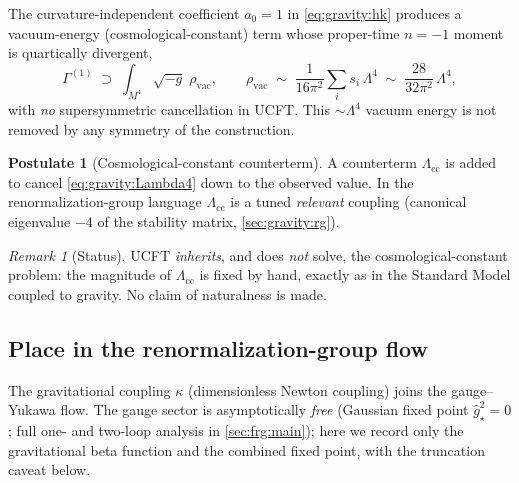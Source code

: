 \documentclass[11pt]{article}
\theoremstyle{plain}
\theoremstyle{definition}
\newtheorem{postulate}[theorem]{Postulate}
\theoremstyle{remark}
\newtheorem{remark}[theorem]{Remark}
\begin{document}
The curvature-independent coefficient $a_{0}=1$ in \eqref{eq:gravity:hk}
produces a vacuum-energy (cosmological-constant) term whose proper-time
$n=-1$ moment is quartically divergent,
\begin{equation}\label{eq:gravity:Lambda4}
  \Gamma^{(1)} \;\supset\;
  \int_{M^{4}}\!\sqrt{-g}\;\rho_{\mathrm{vac}},
  \qquad
  \rho_{\mathrm{vac}}
  \;\sim\;
  \frac{1}{16\pi^{2}}\sum_{i} s_{i}\,\Lambda^{4}
  \;\sim\;
  \frac{28}{32\pi^{2}}\,\Lambda^{4},
\end{equation}
with \emph{no} supersymmetric cancellation in UCFT. This $\sim\Lambda^{4}$
vacuum energy is not removed by any symmetry of the construction.

\begin{postulate}[Cosmological-constant counterterm]
\label{post:gravity:cc}
A counterterm $\Lambda_{\mathrm{cc}}$ is added to cancel
\eqref{eq:gravity:Lambda4} down to the observed value. In the
renormalization-group language $\Lambda_{\mathrm{cc}}$ is a tuned
\emph{relevant} coupling (canonical eigenvalue $-4$ of the stability matrix,
\autoref{sec:gravity:rg}).
\end{postulate}

\begin{remark}[Status]
\label{rmk:gravity:ccstatus}
UCFT \emph{inherits}, and does \emph{not} solve, the cosmological-constant
problem: the magnitude of $\Lambda_{\mathrm{cc}}$ is fixed by hand, exactly
as in the Standard Model coupled to gravity. No claim of naturalness is
made.
\end{remark}

\subsection{Place in the renormalization-group flow}
\label{sec:gravity:rg}
\label{sec:gravity:stability}

The gravitational coupling $\kappa$ (dimensionless Newton coupling) joins
the gauge--Yukawa flow. The gauge sector is asymptotically \emph{free}
(Gaussian fixed point $\hat g^{2}_{\star}=0$; full one- and two-loop
analysis in \autoref{sec:frg:main}); here we record only the gravitational
beta function and the combined fixed point, with the truncation caveat below.
\end{document}
